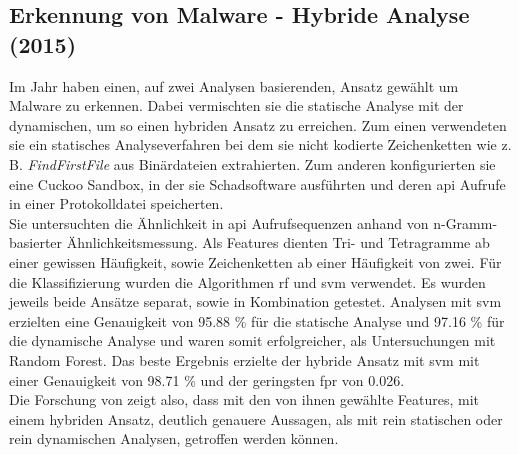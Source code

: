 \documentclass[
    12pt, %
    DIV10,
    ngerman, %
    a4paper, %
    oneside, %
    titlepage, %
    parskip=half, %
    headings=normal, %
    listof=totoc, %
    bibliography=totoc, %
    index=totoc, %
    captions=tableheading, %
    final %
]{scrreprt}
\begin{document}
\subsection{Erkennung von Malware - Hybride Analyse (2015)}
Im Jahr \citeyear{Shijo2015} haben \textcite{Shijo2015} einen, auf zwei Analysen basierenden, Ansatz gewählt um Malware zu erkennen. Dabei vermischten sie die statische Analyse mit der dynamischen, um so einen hybriden Ansatz zu erreichen. Zum einen verwendeten sie ein statisches Analyseverfahren bei dem sie nicht kodierte Zeichenketten wie z. B. \emph{FindFirstFile} aus Binärdateien extrahierten. Zum anderen konfigurierten sie eine Cuckoo Sandbox, in der sie Schadsoftware ausführten und deren \ac{api} Aufrufe in einer Protokolldatei speicherten.\\
Sie untersuchten die Ähnlichkeit in \ac{api} Aufrufsequenzen anhand von n-Gramm-basierter Ähnlichkeitsmessung. 
Als Features dienten Tri- und Tetragramme ab einer gewissen Häufigkeit, sowie Zeichenketten ab einer Häufigkeit von zwei.
Für die Klassifizierung wurden die Algorithmen \ac{rf} und \ac{svm} verwendet.
Es wurden jeweils beide Ansätze separat, sowie in Kombination getestet. Analysen mit \ac{svm} erzielten eine Genauigkeit von 95.88 \% für die statische Analyse und 97.16 \% für die dynamische Analyse und waren somit erfolgreicher, als Untersuchungen mit Random Forest. Das beste Ergebnis erzielte der hybride Ansatz mit \ac{svm} mit einer Genauigkeit von 98.71 \% und der geringsten \ac{fpr} von 0.026.\\
Die Forschung von \textcite{Shijo2015} zeigt also, dass mit den von ihnen gewählte Features, mit einem hybriden Ansatz, deutlich genauere Aussagen, als mit rein statischen oder rein dynamischen Analysen, getroffen werden können.

%
\end{document}
